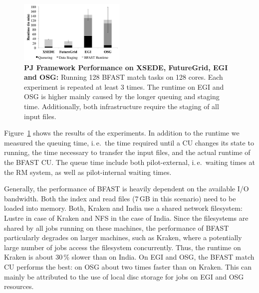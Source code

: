 \documentclass[conference,final]{IEEEtran}
\newcommand{\jhanote}[1]{ {\textcolor{red} { ***shantenu: #1 }}}
\newcommand{\jhanote}[1]{}
\newcommand{\cu}{CU\xspace}
\newcommand{\up}{\vspace*{-1em}}
\begin{document}
\begin{figure}[t]
	\centering
\includegraphics[width=0.45\textwidth]{perf/interop/128-bfast-egi-fg-xsede-osg.pdf}
\caption{\textbf{PJ Framework Performance on XSEDE, FutureGrid, EGI and 
OSG:} Running 128 BFAST match tasks on 128 cores. Each experiment is
          repeated at least 3 times. The runtime on EGI and OSG is higher
          mainly caused by the longer queuing and staging time. Additionally, 
		  both 
		  infrastructure require the staging of all input files. 
		\up\up}

	\label{fig:perf_perf-bfast-bj}
\end{figure}


Figure~\ref{fig:perf_perf-bfast-bj} shows the results of the experiments. In
addition to the runtime we measured the queuing time, i.\,e.\ the time 
required until a \cu changes its state to running, the time necessary to 
transfer the input files, and the actual runtime of the BFAST \cu. The queue 
time include both pilot-external, i.\,e.\ waiting times at the RM system, as 
well as pilot-internal waiting times.

Generally, the performance of BFAST is
heavily dependent on the available I/O bandwidth. Both the index and read files (7\,GB in
this scenario) need to be loaded into memory. Both, Kraken and India use a shared 
network filesystem: Lustre in case of Kraken and NFS in the case of India. Since the
filesystems are shared by all jobs running on these machines, the performance of BFAST particularly degrades on larger machines, such as Kraken, where a potentially large
number of jobs access the filesystem concurrently. Thus, the runtime on Kraken is 
about 30\,\% slower than on India.
On EGI and OSG, the BFAST match \cu performs the best: on OSG about two 
times faster than on Kraken. This can mainly be attributed to the use of local disc
storage for jobs on EGI and OSG resources.
\end{document}
